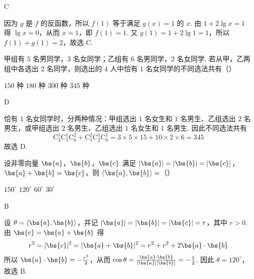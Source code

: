 \begin{answer}
C
\end{answer}

\begin{solution}
因为 \(g\) 是 \(f\) 的反函数，所以 \(f(1)\) 等于满足 \(g(x)=1\) 的 \(x\). 由 \(1+2\lg x=1\) 得 \(\lg x=0\)，从而 \(x=1\)，即 \(f(1)=1\). 又 \(g(1)=1+2\lg1=1\)，所以 \(f(1)+g(1)=2\)，故选 C.
\end{solution}

\begin{problem}
甲组有 \(5\text{ 名}\)男同学，\(3\text{ 名}\)女同学；乙组有 \(6\text{ 名}\)男同学，\(2\text{ 名}\)女同学. 若从甲，乙两组中各选出 \(2\text{ 名}\)同学，则选出的 \(4\text{ 人}\)中恰有 \(1\text{ 名}\)女同学的不同选法共有（\quad）

\choices
    {\(150\text{ 种}\)}
    {\(180\text{ 种}\)}
    {\(300\text{ 种}\)}
    {\(345\text{ 种}\)}
\end{problem}

\begin{answer}
D
\end{answer}

\begin{solution}
恰有 \(1\) 名女同学时，分两种情况：甲组选出 \(1\) 名女生和 \(1\) 名男生、乙组选出 \(2\) 名男生，或甲组选出 \(2\) 名男生、乙组选出 \(1\) 名女生和 \(1\) 名男生. 因此不同选法共有
\[
\mathrm C_3^1\mathrm C_5^1\mathrm C_6^2+\mathrm C_5^2\mathrm C_2^1\mathrm C_6^1=3\times5\times15+10\times2\times6=345
\]
故选 D.
\end{solution}

\begin{problem}
设非零向量 \(\bs{a}\)，\(\bs{b}\)，\(\bs{c}\) 满足 \(|\bs{a}| = |\bs{b}| = |\bs{c}|\)，\(\bs{a} + \bs{b} = \bs{c}\)，则 \(\langle \bs{a}, \bs{b} \rangle =\)（\quad）

\choices
    {\(150^{\circ}\)}
    {\(120^{\circ}\)}
    {\(60^{\circ}\)}
    {\(30^{\circ}\)}
\end{problem}

\begin{answer}
B
\end{answer}

\begin{solution}
设 \(\theta=\langle\bs{a},\bs{b}\rangle\)，并记 \(|\bs{a}|=|\bs{b}|=|\bs{c}|=r\)，其中 \(r>0\). 由 \(\bs{c}=\bs{a}+\bs{b}\) 得
\[
r^2=|\bs{c}|^2=|\bs{a}+\bs{b}|^2=r^2+r^2+2\bs{a}\cdot\bs{b}
\]
所以 \(\bs{a}\cdot\bs{b}=-\frac{r^2}{2}\)，从而 \(\cos\theta=\frac{\bs{a}\cdot\bs{b}}{|\bs{a}||\bs{b}|}=-\frac{1}{2}\). 因此 \(\theta=120^{\circ}\)，故选 B.
\end{solution}

